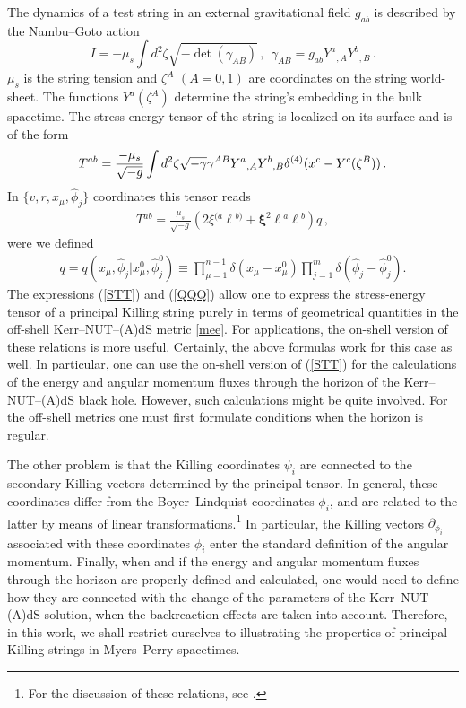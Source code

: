 \documentclass[superscriptaddress,twocolumn,showpacs,
preprintnumbers,amsmath,amssymb,nofootinbib,
longbibliography,aps,prd,10pt]{revtex4-1}
\newcommand{\ts}[1]{{\boldsymbol{#1}}}         %
\newcommand{\be}{\begin{equation}}             %
\newcommand{\ee}{\end{equation}}               %
\newcommand{\n}[1]{\label{#1}}
\begin{document}
The dynamics of a test string in an external gravitational field $g_{ab}$ is described by the Nambu--Goto action
\be
I=-\mu_s \int d^2\zeta \sqrt{- \det\left(\gamma_{AB}\right)}\, ,\ \
\gamma_{AB}= g_{ab}Y^{a}{}_{,A} Y^{b}{}_{,B}\, .
\ee
$\mu_s$ is the string tension and $\zeta^A$ $ (A=0,1)$ are coordinates on the string world-sheet. The functions $Y^{a}(\zeta^A)$ determine the string's embedding in the bulk spacetime. The stress-energy tensor of the string is localized on its surface and is of the form \cite{vilenkin2000cosmic}
\be\n{Tmn}
T^{ab}= {-\mu_s\over \sqrt{-g}} \int d^2\zeta \sqrt{-\gamma} \gamma^{AB} Y^{a}{}_{,A} Y^b{}_{,B} \delta^{(4)}(x^{c}-Y^{c}(\zeta^B))\,  .
\ee
In $\{v,r,x_{\mu},\hat{\phi}_j\}$ coordinates this tensor reads
\begin{align}
T{}^{ab} = \frac{\mu_s}{\sqrt{-g}} \left( 2\xi{}^{(a} \ell{}^{b)} + \ts{\xi}^2 \ell{}^a \ell{}^b \right ) q \, , \label{STT}
\end{align}
were we defined
\begin{align}\n{QQQ}
q = q(x_\mu ,\hat{\phi}_j | x^0_\mu, \hat{\phi}^0_j) \equiv \prod\limits_{\mu=1}^{n-1} \delta(x_\mu - x_\mu^0) \prod\limits_{j=1}^m \delta(\hat{\phi}_j - \hat{\phi}_j^0) .
\end{align}
The expressions (\ref{STT}) and (\ref{QQQ}) allow one to express the stress-energy tensor of a principal Killing string purely in terms of geometrical quantities in the off-shell Kerr--NUT--(A)dS metric \eqref{mee}. For applications, the on-shell version of these relations is more useful. Certainly, the above formulas work for this case as well.
In particular, one can use the on-shell version of (\ref{STT}) for the calculations of the energy and angular momentum fluxes through the horizon of the Kerr--NUT--(A)dS black hole. However, such calculations might be quite involved. For the off-shell metrics one must first formulate conditions when the horizon is regular.

The other problem is that the Killing coordinates $\psi_i$ are connected to the secondary Killing vectors determined by the principal tensor. In general, these coordinates differ from the Boyer--Lindquist coordinates $\phi_i$, and are related to the latter by means of linear transformations.\footnote{For the discussion of these relations, see \cite{Frolov:2017kze}.} In particular, the Killing vectors $\partial_{\phi_i}$ associated with these coordinates $\phi_i$ enter the standard definition of the angular momentum.
Finally, when and if the energy and angular momentum fluxes through the horizon are properly defined and calculated, one would need to define how they are connected with the change of the parameters of the Kerr--NUT--(A)dS solution, when the backreaction effects are taken into account. Therefore, in this work, we shall restrict ourselves to illustrating the properties of principal Killing strings in Myers--Perry spacetimes.
\end{document}
